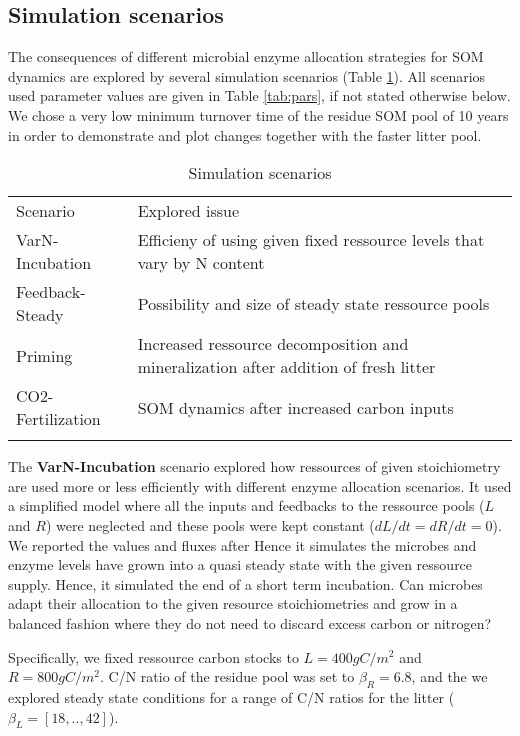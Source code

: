 \subsection{ Simulation scenarios 
\label{sec:SimScen}}

The consequences of different microbial enzyme allocation strategies for SOM
dynamics are explored by several simulation scenarios (Table \ref{tab:SimScen}). 
All scenarios used parameter values are given in Table \ref{tab:pars}, if not
stated otherwise below. We chose a very low minimum turnover time of the
residue SOM pool of 10 years in order to demonstrate and plot changes together
with the faster litter pool.

\begin{table}[t]
\caption{Simulation scenarios \label{tab:SimScen}}
\vskip4mm
\centering
\begin{tabular}{lp{5.3cm}}
\tophline
Scenario & Explored issue\\
\middlehline
VarN-Incubation & Efficieny of using given fixed ressource levels that
vary by N content \\
Feedback-Steady & Possibility and size of steady state ressource pools\\
Priming & Increased ressource decomposition and mineralization after
addition of fresh litter\\
CO2-Fertilization & SOM dynamics after increased carbon inputs\\
\bottomhline
\end{tabular}
\end{table}

The \textbf{VarN-Incubation} scenario explored how ressources of given
stoichiometry are used more or less efficiently with different enzyme allocation
scenarios. It used a simplified model where all the inputs and feedbacks to the
ressource pools ($L$ and $R$) were neglected and these pools were kept constant
($dL/dt = dR/dt = 0$). We reported the values and fluxes after Hence it
simulates the microbes and enzyme levels have grown into a quasi steady state
with the given ressource supply. Hence, it simulated the end of a short term
incubation. Can microbes adapt their allocation to the given resource
stoichiometries and grow in a balanced fashion where they do not need to discard
excess carbon or nitrogen?

Specifically, we fixed ressource carbon stocks to $L=400 gC/m^2$ and
$R=800gC/m^2$. C/N ratio of the residue pool was set to $\beta_R=6.8$, and the
we explored steady state conditions for a range of C/N ratios for the litter
($\beta_L = [18,..,42]$). 

